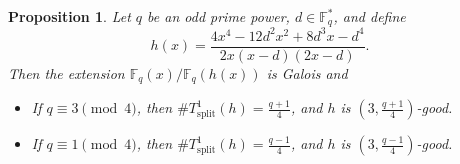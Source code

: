 \documentclass[1p,final]{elsarticle}
\newtheorem{proposition}[theorem]{Proposition}
\newtheorem{open problem}[theorem]{Open Problem}
\begin{document}
\begin{proposition}\label{gal 2}
Let $q$ be an odd prime power, $d\in\mathbb{F}_{q}^{*}$, and define
\[
h(x)=\displaystyle\frac{4x^4-12d^{2}x^{2}+8d^{3}x-d^{4}}{2x(x-d)(2x-d)}.
\]
Then the extension $\mathbb{F}_{q}(x)/\mathbb{F}_{q}(h(x))$ is Galois and 
\begin{itemize}
\item[(i)] If $q\equiv 3 \pmod{4}$, then $\# T_{\text{split}}^1(h) =\displaystyle\frac{q+1}{4}$, and $h$ is $(3, \displaystyle\frac{q+1}{4})$-good.

\item[(ii)] If $q\equiv 1 \pmod{4}$, then $\# T_{\text{split}}^1(h) =\displaystyle\frac{q-1}{4}$, and $h$ is $(3, \displaystyle\frac{q-1}{4})$-good.
\end{itemize}
\end{proposition}
\end{document}
